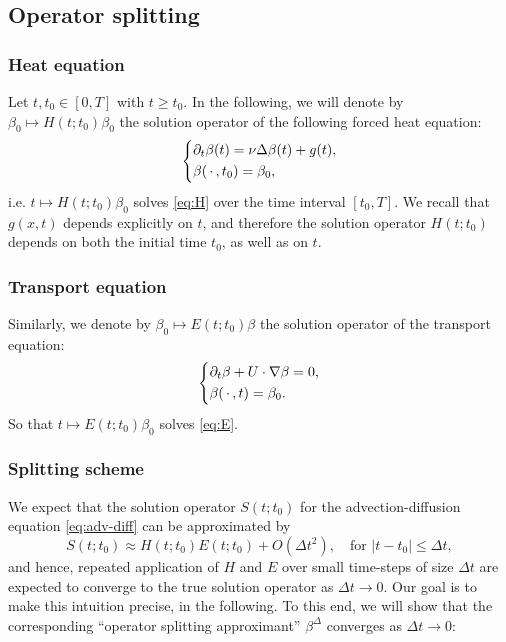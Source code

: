 \documentclass[reqno,12pt]{amsart}
\begin{document}
\subsection{Operator splitting}

\subsubsection{Heat equation}
Let $t,t_0 \in [0,T]$ with $t\ge t_0$. In the following, we will denote by $\beta_0 \mapsto H(t;t_0) \beta_0$ the solution operator of the following forced heat equation:
\begin{align}
  \label{eq:H}
  \left\{
  \begin{aligned}
    &\partial_t \beta(t) = \nu \Delta \beta(t) + g(t), \\
    &\beta({\,\cdot\,}, t_0) = \beta_0,
  \end{aligned}
  \right.
\end{align}
i.e. $t \mapsto H(t;t_0)\beta_0$ solves \eqref{eq:H} over the time interval $[t_0,T]$.
We recall that $g(x,t)$ depends explicitly on $t$, and therefore the solution operator $H(t;t_0)$ depends on both the initial time $t_0$, as well as on $t$.

\subsubsection{Transport equation}

Similarly, we denote by $\beta_0 \mapsto E(t;t_0) \beta$ the solution operator of the transport equation:
\begin{align}
  \label{eq:E}
  \left\{
  \begin{aligned}
    &\partial_t \beta + U \cdot \nabla \beta = 0, \\
    &\beta({\,\cdot\,}, t) = \beta_0.
  \end{aligned}
  \right.
\end{align}
So that $t \mapsto E(t;t_0) \beta_0$ solves \eqref{eq:E}.

\subsubsection{Splitting scheme}

We expect that the solution operator $S(t;t_0)$ for the advection-diffusion equation \eqref{eq:adv-diff} can be approximated by
\[
S(t;t_0) \approx H(t;t_0)E(t;t_0) + O(\Delta t^2), \quad \text{for } |t-t_0| \le \Delta t,
\]
and hence, repeated application of $H$ and $E$ over small time-steps of size $\Delta t$ are expected to converge to the true solution operator as $\Delta t \to 0$. Our goal is to make this intuition precise, in the following. To this end, we will show that the corresponding ``operator splitting approximant'' $\beta^\Delta$ converges as $\Delta t \to 0$:
\end{document}
